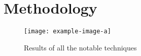 \chapter{Methodology}
\label{ch:Methodology}







\begin{figure}
    \centering
    \texttt{[image: example-image-a]}
    \caption{Results of all the notable techniques }
    \label{tab:results}
\end{figure}
